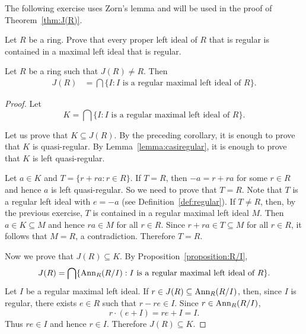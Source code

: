 The following exercise uses Zorn's lemma 
and will be used in the proof of Theorem~\ref{thm:J(R)}. 

\begin{exercise}
\label{xca:regular}
    Let $R$ be a ring. 
    Prove that every proper left ideal of $R$ that 
    is regular is contained in a maximal left ideal that is regular. 
\end{exercise}

\begin{theorem}
	\label{thm:J(R)}
	Let $R$ be a ring such that $J(R)\ne R$. Then 
	\begin{align*}
		J(R)&=\bigcap\{I:\text{$I$ is a regular maximal left ideal of $R$}\}.
	\end{align*}
\end{theorem}

\begin{proof}
        Let 
	\[
	K=\bigcap\{I:\text{$I$ is a regular maximal left ideal of $R$}\}.
	\]
        
        Let us prove that $K\subseteq J(R)$. By the preceding corollary, it is
        enough to prove that $K$ is quasi-regular. By
        Lemma~\ref{lemma:casiregular}, it is enough to prove that $K$ is left
        quasi-regular. 

        Let $a\in K$ and $T=\{r+ra:r\in R\}$. 
        If $T=R$, then $-a=r+ra$ for some $r\in R$ and hence 
        $a$ is left quasi-regular. So we need to prove that $T=R$. Note that 
        $T$ is a regular left ideal with $e=-a$ (see
        Definition~\ref{def:regular}). If $T\ne R$, then, by the previous
        exercise, $T$ is contained in a regular maximal left ideal $M$. Then
        $a\in K\subseteq M$ and hence $ra\in M$ for all $r\in R$. Since
        $r+ra\in T\subseteq M$ for all $r\in R$, it follows that $M=R$, a
        contradiction. Therefore $T=R$. 
        
        Now we prove that $J(R)\subseteq K$. 
		By
	Proposition~\ref{proposition:R/I}, 
	\[
		J(R)=\bigcap\{\operatorname{Ann}_R(R/I):I\text{ is a regular maximal left ideal of $R$}\}.
	\]
	Let $I$ be a regular maximal left ideal. If $r\in J(R)\subseteq
	\operatorname{Ann}_R(R/I)$, then, since $I$ is regular, there exists $e\in R$ such that
	$r-re\in I$. Since 
    $r\in\operatorname{Ann}_R(R/I)$, 
	\[
    r\cdot(e+I)=re+I=I.
	\]
	Thus $re\in I$ and hence $r\in I$. Therefore  $J(R)\subseteq K$. 
\end{proof}

